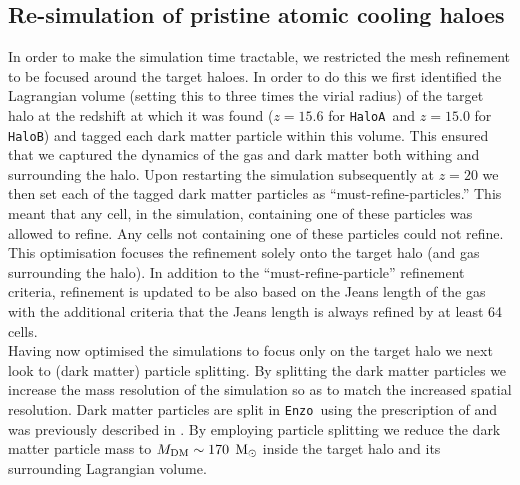 \documentclass[graphics, twocolumn, usenatbib]{mn2e}
\newcommand{\enzo}{\texttt{Enzo~}}
\newcommand{\msolar} {$\rm{M_{\odot}}~$}
\newcommand{\ha} {\texttt{HaloA~}}
\newcommand{\hbc} {\texttt{HaloB}}
\begin{document}
 \subsection{Re-simulation of pristine atomic cooling haloes} \label{Sec:Resimulation}
In order to make the simulation time tractable, we restricted the mesh refinement to be focused
around the target haloes. In order to do this we first identified the Lagrangian
volume (setting this to three times the virial radius) of the target halo
at the redshift at which it was found ($z = 15.6$ for \ha and $z = 15.0$
 for \hbc) and tagged each dark matter particle within this volume. This ensured
 that we  captured the dynamics of the gas and dark matter both withing and surrounding the halo.
 Upon restarting
 the simulation subsequently at $z = 20$ we then set each of the tagged dark matter particles as
 ``must-refine-particles.'' This meant that any cell, in the simulation, containing one of these
 particles was allowed to refine. Any cells not containing one of these particles could not refine.
 This optimisation focuses the refinement solely onto the target halo (and gas surrounding the halo).
 In addition to the ``must-refine-particle'' refinement criteria,  refinement is updated to be
 also based on the Jeans length of the
 gas with the additional criteria that the Jeans length is always refined by at least 64 cells. \\ 
 \indent Having now optimised the simulations to focus only on the target halo 
 we next look to (dark matter) particle splitting. By splitting the dark matter
 particles we increase the mass resolution of the simulation so as to match the increased spatial resolution.
 Dark matter particles are split in \enzo using the prescription of \cite{Kitsionas_2002} and was previously
 described in \cite{Regan_2015}. By employing particle splitting we reduce the dark matter particle mass
 to $M_{\rm DM} \sim 170$ \msolar inside the target halo and its surrounding Lagrangian volume.
\end{document}
